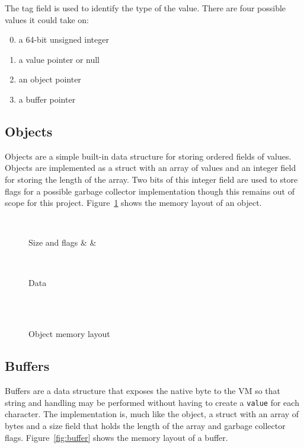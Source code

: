 \documentclass[english,a4paper,12pt]{report}
\begin{document}
The tag field is used to identify the type of the value. There are
four possible values it could take on:
\begin{enumerate}
	\setcounter{enumi}{-1}
	\item a 64-bit unsigned integer
	\item a value pointer or null
	\item an object pointer \setcounter{enumi}{3}
	\item a buffer pointer
\end{enumerate}

\subsection{Objects}

Objects are a simple built-in data structure for storing ordered
fields of values. Objects are implemented as a struct with an array of
values and an integer field for storing the length of the array. Two
bits of this integer field are used to store flags for a possible
garbage collector implementation though this remains out of scope for
this project. Figure~\ref{fig:objmem} shows the memory layout of an
object.

\begin{figure}[!htb]
	\centering
	\begin{bytefield}[bitwidth=0.3em,endianness=big]{64}
		 \\
		\begin{rightwordgroup}{Size and flags}
			 & \bitbox{1}{} & 
		\end{rightwordgroup} \\
		
		\begin{rightwordgroup}{Data}
				\\
			 \\[1ex]
		\end{rightwordgroup} \\
	\end{bytefield}
	\caption{Object memory layout}
	\label{fig:objmem}
\end{figure}

\subsection{Buffers}

Buffers are a data structure that exposes the native byte to the VM so
that string and handling may be performed without having to create a
\verb|value| for each character. The implementation is, much like the
object, a struct with an array of bytes and a size field that holds
the length of the array and garbage collector
flags. Figure~\ref{fig:buffer} shows the memory layout of a buffer.
\end{document}
